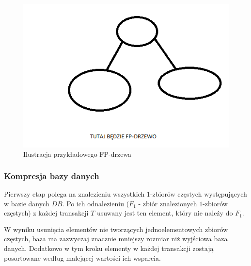 \begin{figure}[h]
\centering\includegraphics{figures/fptree.png}
\caption{Ilustracja przykładowego FP-drzewa}\label{rys:fptree}
\end{figure}

\subsubsection{Kompresja bazy danych}
Pierwszy etap polega na znalezieniu wszystkich $1$-zbiorów częstych występujących w bazie danych $DB$. Po ich odnalezieniu ($F_1$ - zbiór znalezionych $1$-zbiorów częstych) z każdej transakcji $T$ usuwany jest ten element, który nie należy do $F_1$. 

W wyniku usunięcia elementów nie tworzących jednoelementowych zbiorów częstych, baza ma zazwyczaj znacznie mniejszy rozmiar niż wyjściowa baza danych. Dodatkowo w tym kroku elementy w każdej transakcji zostają posortowane według malejącej wartości ich wsparcia.


